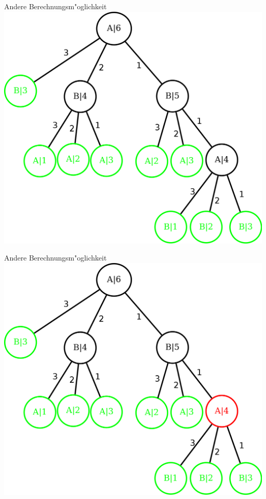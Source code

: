 \documentclass[18pt]{beamer}
\begin{document}
\begin{frame}{Andere Berechnungsm"oglichkeit}
\includegraphics[scale=0.4]{baum4.png}
\end{frame}

\begin{frame}{Andere Berechnungsm"oglichkeit}
\includegraphics[scale=0.4]{baum5.png}
\end{frame}
\end{document}
